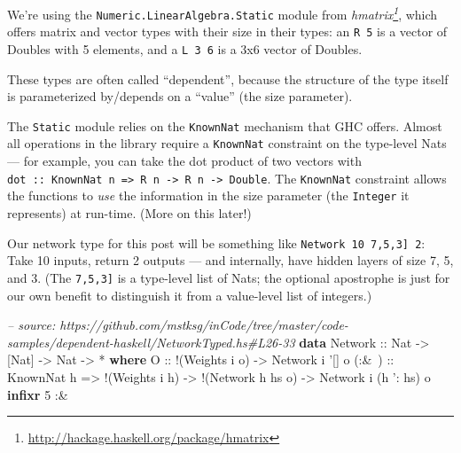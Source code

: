 \documentclass[]{article}
\newenvironment{Shaded}{}{}
\newcommand{\KeywordTok}[1]{\textcolor[rgb]{0.00,0.44,0.13}{\textbf{{#1}}}}
\newcommand{\DataTypeTok}[1]{\textcolor[rgb]{0.56,0.13,0.00}{{#1}}}
\newcommand{\DecValTok}[1]{\textcolor[rgb]{0.25,0.63,0.44}{{#1}}}
\newcommand{\CharTok}[1]{\textcolor[rgb]{0.25,0.44,0.63}{{#1}}}
\newcommand{\CommentTok}[1]{\textcolor[rgb]{0.38,0.63,0.69}{\textit{{#1}}}}
\newcommand{\OtherTok}[1]{\textcolor[rgb]{0.00,0.44,0.13}{{#1}}}
\newcommand{\FunctionTok}[1]{\textcolor[rgb]{0.02,0.16,0.49}{{#1}}}
\newcommand{\NormalTok}[1]{{#1}}
\renewcommand{\href}[2]{#2\footnote{\url{#1}}}
\begin{document}
We're using the \texttt{Numeric.LinearAlgebra.Static} module from
\emph{\href{http://hackage.haskell.org/package/hmatrix}{hmatrix}}, which
offers matrix and vector types with their size in their types: an
\texttt{R\ 5} is a vector of Doubles with 5 elements, and a
\texttt{L\ 3\ 6} is a 3x6 vector of Doubles.

These types are often called ``dependent'', because the structure of the
type itself is parameterized by/depends on a ``value'' (the size
parameter).

The \texttt{Static} module relies on the \texttt{KnownNat} mechanism
that GHC offers. Almost all operations in the library require a
\texttt{KnownNat} constraint on the type-level Nats --- for example, you
can take the dot product of two vectors with
\texttt{dot\ ::\ KnownNat\ n\ =\textgreater{}\ R\ n\ -\textgreater{}\ R\ n\ -\textgreater{}\ Double}.
The \texttt{KnownNat} constraint allows the functions to \emph{use} the
information in the size parameter (the \texttt{Integer} it represents)
at run-time. (More on this later!)

Our network type for this post will be something like
\texttt{Network\ 10\ \textquotesingle{}{[}7,5,3{]}\ 2}: Take 10 inputs,
return 2 outputs --- and internally, have hidden layers of size 7, 5,
and 3. (The \texttt{\textquotesingle{}{[}7,5,3{]}} is a type-level list
of Nats; the optional \texttt{\textquotesingle{}} apostrophe is just for
our own benefit to distinguish it from a value-level list of integers.)

\begin{Shaded}
\begin{Highlighting}[]
\CommentTok{-- source: https://github.com/mstksg/inCode/tree/master/code-samples/dependent-haskell/NetworkTyped.hs#L26-33}
\KeywordTok{data} \DataTypeTok{Network}\OtherTok{ ::} \DataTypeTok{Nat} \OtherTok{->} \NormalTok{[}\DataTypeTok{Nat}\NormalTok{] }\OtherTok{->} \DataTypeTok{Nat} \OtherTok{->} \FunctionTok{*} \KeywordTok{where}
    \DataTypeTok{O}\OtherTok{     ::} \FunctionTok{!}\NormalTok{(}\DataTypeTok{Weights} \NormalTok{i o)}
          \OtherTok{->} \DataTypeTok{Network} \NormalTok{i }\CharTok{'[] o}
\OtherTok{    (:&~) ::} \DataTypeTok{KnownNat} \NormalTok{h}
          \OtherTok{=>} \FunctionTok{!}\NormalTok{(}\DataTypeTok{Weights} \NormalTok{i h)}
          \OtherTok{->} \FunctionTok{!}\NormalTok{(}\DataTypeTok{Network} \NormalTok{h hs o)}
          \OtherTok{->} \DataTypeTok{Network} \NormalTok{i (h }\CharTok{': hs) o}
\KeywordTok{infixr} \DecValTok{5} \FunctionTok{:&~}
\end{Highlighting}
\end{Shaded}
\end{document}
